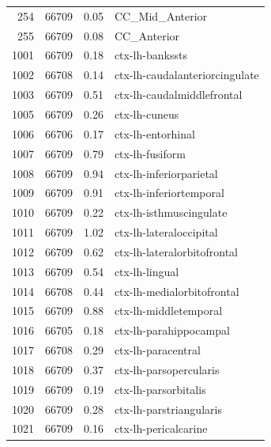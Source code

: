 \documentclass[pdflatex,sn-nature]{sn-jnl}%
\theoremstyle{thmstyleone}%
\theoremstyle{thmstyletwo}%
\theoremstyle{thmstylethree}%
\begin{document}
\begin{appendices}
\begin{small}
\begin{longtable}{r|r|r|l}
    254 &     66709 &                0.05 &                 CC\_Mid\_Anterior \\
    255 &     66709 &                0.08 &                     CC\_Anterior \\
   1001 &     66709 &                0.18 &                 ctx-lh-bankssts \\
   1002 &     66708 &                0.14 &  ctx-lh-caudalanteriorcingulate \\
   1003 &     66709 &                0.51 &      ctx-lh-caudalmiddlefrontal \\
   1005 &     66709 &                0.26 &                   ctx-lh-cuneus \\
   1006 &     66706 &                0.17 &               ctx-lh-entorhinal \\
   1007 &     66709 &                0.79 &                 ctx-lh-fusiform \\
   1008 &     66709 &                0.94 &         ctx-lh-inferiorparietal \\
   1009 &     66709 &                0.91 &         ctx-lh-inferiortemporal \\
   1010 &     66709 &                0.22 &         ctx-lh-isthmuscingulate \\
   1011 &     66709 &                1.02 &         ctx-lh-lateraloccipital \\
   1012 &     66709 &                0.62 &     ctx-lh-lateralorbitofrontal \\
   1013 &     66709 &                0.54 &                  ctx-lh-lingual \\
   1014 &     66708 &                0.44 &      ctx-lh-medialorbitofrontal \\
   1015 &     66709 &                0.88 &           ctx-lh-middletemporal \\
   1016 &     66705 &                0.18 &          ctx-lh-parahippocampal \\
   1017 &     66708 &                0.29 &              ctx-lh-paracentral \\
   1018 &     66709 &                0.37 &          ctx-lh-parsopercularis \\
   1019 &     66709 &                0.19 &            ctx-lh-parsorbitalis \\
   1020 &     66709 &                0.28 &         ctx-lh-parstriangularis \\
   1021 &     66709 &                0.16 &            ctx-lh-pericalcarine \\

\end{longtable}
\end{small}
\end{appendices}
\end{document}
